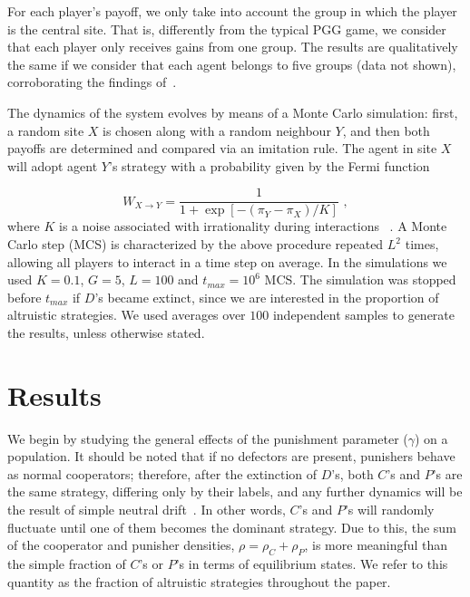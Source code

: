 \documentclass[5p]{elsarticle}
\begin{document}
For each player's payoff, we only take into account the group in which the player is the central site. That is, differently from the typical PGG game, we consider that each player only receives gains from one group. The results are qualitatively the same if we consider that each agent belongs to five groups (data not shown), corroborating the findings of~\cite{szolnoki_pre09c,szolnoki_pre11c,hauert2003prisoner}.

The dynamics of the system evolves by means of a Monte Carlo simulation: first, a random site $ X $ is chosen along with a random neighbour $ Y $, and then both payoffs are determined and compared via an imitation rule. The agent in site $ X $  will adopt agent $ Y $'s strategy with a probability given by the Fermi function

  \begin{equation}
  \label{eq.transition}
     W_{X\rightarrow Y}= \frac{1}{1+\exp[-(\pi_Y-\pi_X)/K]} \,\,,   
 \end{equation}
where $ K $ is a noise associated with irrationality during interactions ~\cite{Szabo2007,szolnoki_pre09c}. 
%
A Monte Carlo step (MCS) is characterized by the above procedure repeated $L^2$ times, allowing all players to interact in a time step on average. In the simulations we used $K=0.1$, $G=5$, $ L = 100 $ and $ t_ {max} = 10 ^ 6 $ MCS. The simulation was stopped before $t_{max}$ if $D$'s became extinct, since we are interested in the proportion of altruistic strategies. We used averages over $100$ independent samples to generate  the results, unless  otherwise stated. 

\section{Results}

We begin by studying the general effects of the punishment parameter ($\gamma$) on a population.  It should be noted that if no defectors are present, punishers behave as normal cooperators; therefore, after the extinction of $D$'s,  both $C$'s and $P$'s are the same strategy, differing only by their labels, and any further dynamics will be the result of simple neutral drift~\cite{Nowak2006}. In other words, $C$'s and $P$'s will randomly fluctuate until one of them becomes the dominant strategy. Due to this, the sum of the cooperator and punisher densities, $\rho=\rho_C+\rho_P$, is more meaningful than the simple fraction of $C$'s or $P$'s in terms of equilibrium states. We refer to this quantity as the fraction of altruistic strategies throughout the paper.
 
\end{document}
